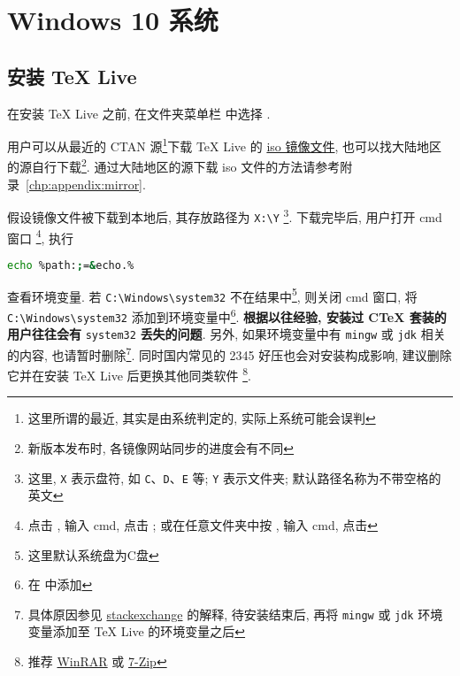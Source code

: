 
\chapter{Windows 10 系统}

\section{安装 \TeX{} Live}\label{sec:windows:install}

在安装 \TeX{} Live 之前,
在文件夹菜单栏  中选择 .

用户可以从最近的 CTAN 源\footnote{这里所谓的最近, 其实是由系统判定的, 实际上系统可能会误判}下载 \TeX{} Live 的
\href{https://mirrors.ctan.org/systems/texlive/Images/texlive2022.iso}{iso 镜像文件},
也可以找大陆地区的源自行下载\footnote{新版本发布时, 各镜像网站同步的进度会有不同}.
通过大陆地区的源下载 iso 文件的方法请参考附录~\ref{chp:appendix:mirror}.

假设镜像文件被下载到本地后,
其存放路径为 \texttt{X:\textbackslash Y}%
\footnote{这里, \texttt{X} 表示盘符,
如 \texttt{C}、\texttt{D}、\texttt{E} 等;
\texttt{Y} 表示文件夹;
默认路径名称为不带空格的英文}.
下载完毕后, 用户打开 \textsf{cmd} 窗口%
\footnote{点击 \keys{\faWindows},
输入 \textsf{cmd},
点击 \keys{\enter};
或在任意文件夹中按 ,
输入 \textsf{cmd},
点击 \keys{\enter}},
执行
\begin{lstlisting}[language = bash]
  echo %path:;=&echo.%
\end{lstlisting}
查看环境变量. 
若 \texttt{C:\textbackslash Windows\textbackslash system32}
不在结果中\footnote{这里默认系统盘为\textsf{C}盘},
则关闭 \textsf{cmd} 窗口,
将 \texttt{C:\textbackslash Windows\textbackslash system32}
添加到环境变量中\footnote{在  中添加}.
\textbf{根据以往经验, 安装过 C\TeX{} 套装的用户往往会有} \texttt{system32} \textbf{丢失的问题}. 
另外, 如果环境变量中有 \texttt{mingw} 或 \texttt{jdk} 相关的内容,
也请暂时删除\footnote{具体原因参见
\href{https://tex.stackexchange.com/questions/445086/error-installing-latest-version-of-tex-live-on-windows-10}{stackexchange} 
的解释, 待安装结束后, 再将 \texttt{mingw} 或 \texttt{jdk} 环境变量添加至 \TeX{} Live 的环境变量之后}.
同时国内常见的 2345 好压也会对安装构成影响,
建议删除它并在安装 \TeX{} Live 后更换其他同类软件%
\footnote{推荐 \href{http://www.winrar.com.cn/}{WinRAR}
或 \href{https://www.7-zip.org/}{7-Zip}}.

